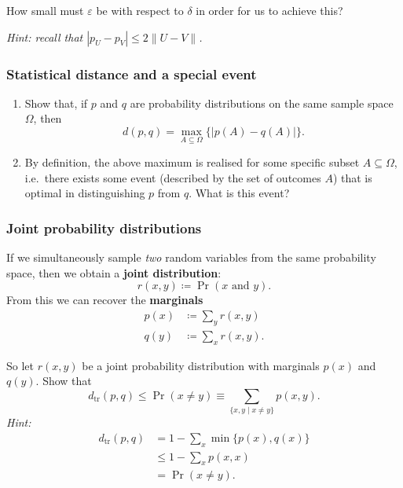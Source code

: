\documentclass[fleqn]{article}
\providecommand{\tightlist}{%
  \setlength{\itemsep}{0pt}\setlength{\parskip}{0pt}}
\begin{document}
How small must \(\varepsilon\) be with respect to \(\delta\) in order for us to achieve this?

\emph{Hint: recall that \(|p_U-p_V|\leqslant 2\|U-V\|\).}

\hypertarget{statistical-distance-and-a-special-event}{%
\subsubsection{Statistical distance and a special event}\label{statistical-distance-and-a-special-event}}

\begin{enumerate}
\def\labelenumi{\arabic{enumi}.}
\tightlist
\item
  Show that, if \(p\) and \(q\) are probability distributions on the same sample space \(\Omega\), then
  \[
   d(p,q) = \max_{A\subseteq\Omega}\{|p(A)-q(A)|\}.
    \]
\item
  By definition, the above maximum is realised for some specific subset \(A\subseteq\Omega\), i.e.~there exists some event (described by the set of outcomes \(A\)) that is optimal in distinguishing \(p\) from \(q\).
  What is this event?
\end{enumerate}

\hypertarget{joint-probability-distributions}{%
\subsubsection{Joint probability distributions}\label{joint-probability-distributions}}

If we simultaneously sample \emph{two} random variables from the same probability space, then we obtain a \textbf{joint distribution}:
\[
  r(x,y) \coloneqq \Pr(x\text{ and }y).
\]
From this we can recover the \textbf{marginals}
\[
  \begin{aligned}
    p(x)
    &\coloneqq \sum_y r(x,y)
  \\q(y)
    &\coloneqq \sum_x r(x,y).
  \end{aligned}
\]

So let \(r(x,y)\) be a joint probability distribution with marginals \(p(x)\) and \(q(y)\).
Show that
\[
  d_{\operatorname{tr}}(p,q) \leqslant\Pr(x\neq y)
  \equiv \sum_{\{x,y\mid x\neq y\}} p(x,y).
\]
\emph{Hint:}
\[
  \begin{aligned}
    d_{\operatorname{tr}}(p,q)
    &= 1 - \sum_x \min\{p(x),q(x)\}
  \\&\leqslant 1 - \sum_x p(x,x)
  \\&= \Pr(x\neq y).
  \end{aligned}
\]
\end{document}
